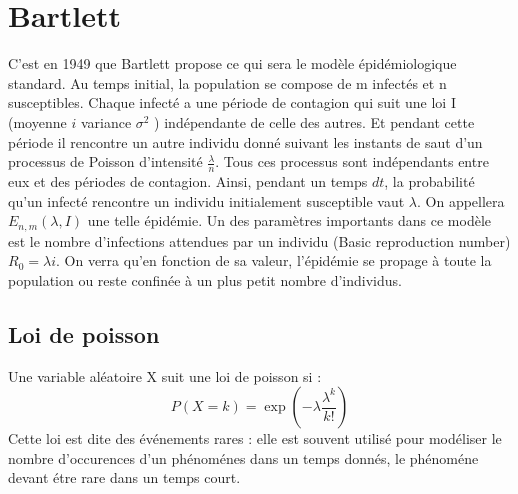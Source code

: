 \section{Bartlett}

C’est en 1949 que Bartlett propose ce qui sera le modèle épidémiologique standard. Au temps
initial, la population se compose de m infectés et n susceptibles. Chaque infecté a une période de
contagion qui suit une loi I (moyenne $i$ variance $\sigma^2$ ) indépendante de celle des autres. Et pendant
cette période il rencontre un autre individu donné suivant les instants de saut d’un processus de
Poisson d’intensité $\frac{\lambda}{n}$. Tous ces processus sont indépendants entre eux et des périodes de
contagion. Ainsi, pendant un temps $dt$, la probabilité qu’un infecté rencontre un individu initialement
susceptible vaut $\lambda$. On appellera $E_{n,m}(\lambda, I)$ une telle épidémie. Un des paramètres importants dans
ce modèle est le nombre d’infections attendues par un individu (Basic reproduction number) $R_0 =
\lambda i$. On verra qu’en fonction de sa valeur, l’épidémie se propage à toute la population ou reste
confinée à un plus petit nombre d’individus.

\subsection{Loi de poisson}

Une variable aléatoire X suit une loi de poisson si :
$$ P(X=k) = \exp(-\lambda \frac{\lambda^k}{k!}) $$
Cette loi est dite des événements rares : elle est souvent utilisé pour modéliser le nombre d'occurences d'un phénoménes dans un temps donnés, le phénoméne devant étre rare dans un temps court.
